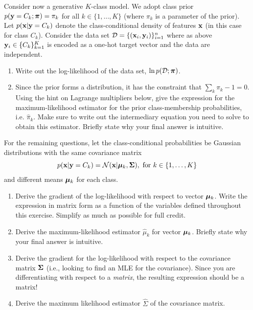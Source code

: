 \documentclass[submit]{../harvardml}
\begin{document}
\newpage

\begin{problem}

Consider now a generative $K$-class model.  We adopt class prior
$p(\mathbf{y} = C_k; \boldsymbol{\pi}) = \pi_k$ for all $k \in \{1, \ldots, K\}$
(where $\pi_k$ is a parameter of the prior).
Let  $p(\mathbf{x}|\mathbf{y}=C_k)$ denote
the class-conditional density of features $\mathbf{x}$ (in this
case for class $C_k$). Consider the data set $\mathcal{D} = \{(\mathbf{x}_i, \mathbf{y}_i)\}_{i=1}^n$ where as above $\mathbf{y}_i \in \{C_k\}_{k=1}^K$ is
encoded as a one-hot target vector and the data are independent.

\begin{enumerate}
  \item Write out the log-likelihood of the data set, $\ln p(\mathcal{D} ; \boldsymbol{\pi})$.

  \item Since the prior forms a distribution, it has the constraint that
        $\sum_k\pi_k - 1 = 0$.  Using the hint on
        Lagrange multipliers below, give the
        expression for the maximum-likelihood estimator for the prior
        class-membership probabilities, i.e.
        $\hat \pi_k.$
        Make sure to write out the intermediary equation you need
        to solve to obtain this estimator. Briefly state why your final answer is intuitive.
\end{enumerate}

For the remaining questions, let the
class-conditional probabilities be Gaussian distributions with
the same covariance matrix
$$p(\mathbf{x} | \mathbf{y} = C_k) = \mathcal{N}(\mathbf{x} |  \boldsymbol{\mu}_k, \mathbf{\Sigma}), \text{\ for\ }k \in \{1,\ldots, K\}$$
and different means $\boldsymbol{\mu}_k$ for each class.

\begin{enumerate}
  \item[3.] Derive the gradient of the log-likelihood with respect to vector $\boldsymbol{\mu}_k$.
    Write the expression in matrix form as a function of the variables defined
    throughout this exercise. Simplify as much as possible for full credit.
  \item[4.] Derive the maximum-likelihood estimator $\hat{\mu}_k$ for vector $\boldsymbol{\mu}_k$. Briefly state why your final answer is intuitive.
  \item[5.] Derive the gradient for the log-likelihood with respect to the
    covariance matrix $\mathbf{\Sigma}$ (i.e., looking
    to find an MLE for the covariance).
    Since you are differentiating with respect to a
    \emph{matrix}, the resulting expression should be a matrix!
  \item[6.] Derive the maximum likelihood estimator $\hat{\Sigma}$ of the covariance matrix.
\end{enumerate}


\end{problem}
\end{document}
